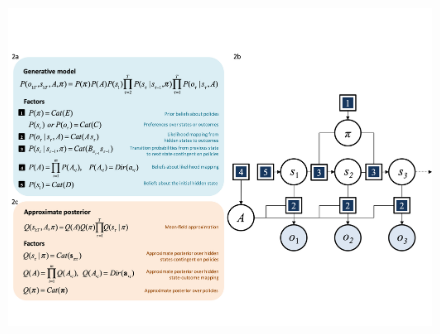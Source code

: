 \documentclass{article}
\begin{document}
\begin{figure}
    \centering
    \includegraphics[width=\textwidth]{FigureGenMod.png}

\end{figure}
\end{document}

